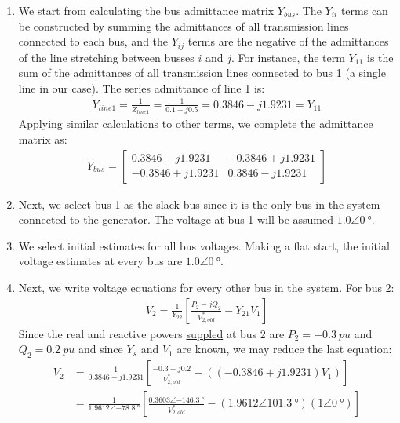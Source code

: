 \begin{enumerate}
	\item We start from calculating the bus admittance matrix $Y_{bus}$. The $Y_{ii}$ terms can be constructed by summing the admittances of all transmission lines connected to each bus, and the $Y_{ij}$ terms are the negative of the admittances of the line stretching between busses $i$ and $j$. For instance, the term $Y_{11}$ is the sum of the admittances of all transmission lines connected to bus 1 (a single line in our case). The series admittance of line 1 is:
	      \begin{gather}
		      Y_{line1} = \frac{1}{Z_{line1}}= \frac{1}{0.1+j0.5} = 0.3846-j1.9231=Y_{11}
	      \end{gather}
	      Applying similar calculations to other terms, we complete the admittance matrix as:
	      \begin{gather}
		      Y_{bus} = \begin{bmatrix}
			      0.3846-j1.9231  & -0.3846+j1.9231 \\
			      -0.3846+j1.9231 & 0.3846-j1.9231
		      \end{bmatrix}
	      \end{gather}
	\item Next, we select bus 1 as the slack bus since it is the only bus in the system connected to the generator. The voltage at bus 1 will be assumed $1.0\angle\SI{0}{\degree}$.
	\item We select initial estimates for all bus voltages. Making a flat start, the initial voltage estimates at every bus are $1.0\angle\SI{0}{\degree}$.
	\item Next, we write voltage equations for every other bus in the system. For bus 2:
	      \begin{gather}
		      V_2 = \frac{1}{Y_{22}}\left[ \frac{P_2-jQ_2}{V^*_{2,old}}-Y_{21}V_1 \right]
	      \end{gather}
	      Since the real and reactive powers \underline{suppled} at bus 2 are $P_2 = \SI{-0.3}{pu}$ and $Q_2 = \SI{0.2}{pu}$ and since $Y_s$ and $V_1$ are known, we may reduce the last equation:
	      \begin{align}
		      V_2 & = \frac{1}{0.3846 - j1.9231}\left[\frac{-0.3-j0.2}{V^*_{2,old}}-\left(\left(-0.3846+j1.9231\right)V_1\right)\right]                                                                          \\
		          & = \frac{1}{1.9612\angle\SI{-78.8}{\degree}}\left[\frac{0.3603\angle\SI{-146.3}{\degree}}{V^*_{2,old}}-\left(1.9612\angle\SI{101.3}{\degree}\right)\left(1\angle\SI{0}{\degree}\right)\right]

\end{align}
\end{enumerate}
